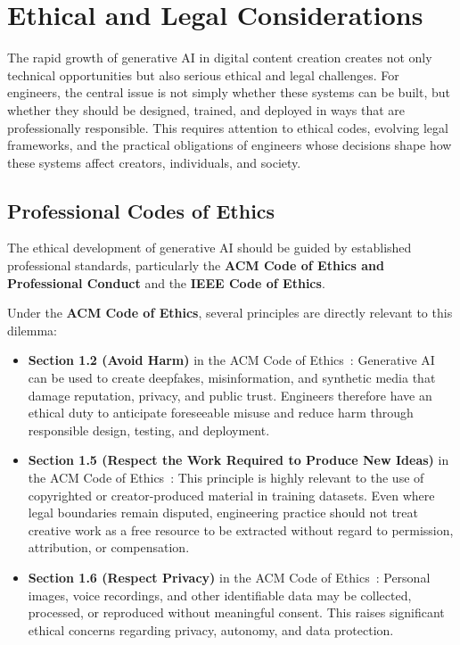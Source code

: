 \section{Ethical and Legal Considerations}\label{sec:ethics-legal}

The rapid growth of generative AI in digital content creation creates not only technical opportunities but also serious ethical and legal challenges. For engineers, the central issue is not simply whether these systems can be built, but whether they should be designed, trained, and deployed in ways that are professionally responsible. This requires attention to ethical codes, evolving legal frameworks, and the practical obligations of engineers whose decisions shape how these systems affect creators, individuals, and society.

\subsection{Professional Codes of Ethics}\label{sec:codes-of-ethics}

The ethical development of generative AI should be guided by established professional standards, particularly the \textbf{ACM Code of Ethics and Professional Conduct} and the \textbf{IEEE Code of Ethics}.

Under the \textbf{ACM Code of Ethics}, several principles are directly relevant to this dilemma:
\begin{itemize}
    \item \textbf{Section 1.2 (Avoid Harm)} in the ACM Code of Ethics~\cite{acm}: Generative AI can be used to create deepfakes, misinformation, and synthetic media that damage reputation, privacy, and public trust. Engineers therefore have an ethical duty to anticipate foreseeable misuse and reduce harm through responsible design, testing, and deployment.

    \item \textbf{Section 1.5 (Respect the Work Required to Produce New Ideas)} in the ACM Code of Ethics~\cite{acm}: This principle is highly relevant to the use of copyrighted or creator-produced material in training datasets. Even where legal boundaries remain disputed, engineering practice should not treat creative work as a free resource to be extracted without regard to permission, attribution, or compensation.

    \item \textbf{Section 1.6 (Respect Privacy)} in the ACM Code of Ethics~\cite{acm}: Personal images, voice recordings, and other identifiable data may be collected, processed, or reproduced without meaningful consent. This raises significant ethical concerns regarding privacy, autonomy, and data protection.
\end{itemize}


